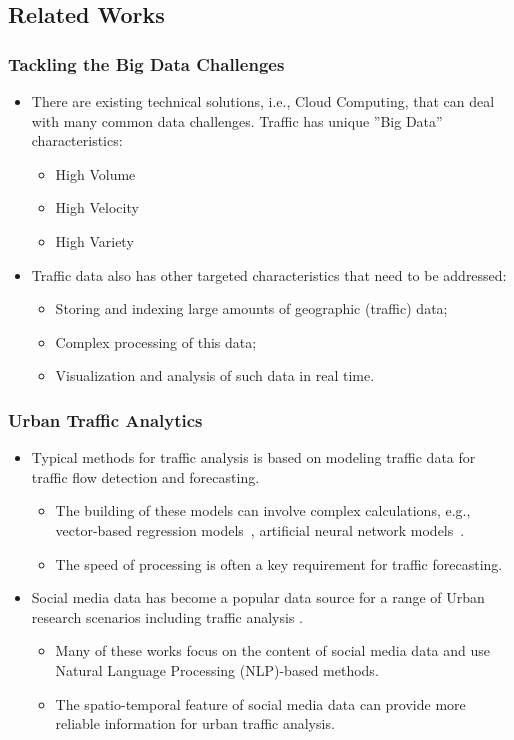 \subsection{Related Works}

\begin{frame}
    \frametitle{Tackling the Big Data Challenges}
    \begin{itemize}
	    \item There are existing technical solutions, i.e., Cloud Computing, that can deal with many common data challenges. Traffic has unique ''Big Data'' characteristics:
	        \begin{itemize}
	            \item High Volume
	            \item High Velocity
	            \item High Variety
	        \end{itemize}
	    \item Traffic data also has other targeted characteristics that need to be addressed:
	    \begin{itemize}
	        \item Storing and indexing large amounts of geographic (traffic) data;
	        \item Complex processing of this data;
	        \item Visualization and analysis of such data in real time.
	    \end{itemize}
    \end{itemize}
\end{frame}

\begin{frame}
    \frametitle{Urban Traffic Analytics}
    \begin{itemize}
	    \item Typical methods for traffic analysis is based on modeling traffic data for traffic flow detection and forecasting.
	    \begin{itemize}
	        \item The building of these models can involve complex calculations, e.g., vector-based regression models~\cite{cao2007robust}, artificial neural network models~\cite{ye2009neural}.
	        \item The speed of processing is often a key requirement for traffic forecasting.
	    \end{itemize}
	    \item Social media data has become a popular data source for a range of Urban research scenarios including traffic analysis \cite{feldman2013techniques}.
	    \begin{itemize}
	        \item Many of these works focus on the content of social media data and use Natural Language Processing (NLP)-based methods.
	        \item The spatio-temporal feature of social media data can provide more reliable information for urban traffic analysis.
	    \end{itemize}
    \end{itemize}
\end{frame}


